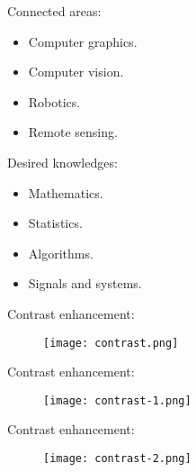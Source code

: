 
\begin{frame}
Connected areas:
\begin{itemize}
\item Computer graphics.
\item Computer vision.
\item Robotics.
\item Remote sensing.
\end{itemize}
\end{frame}


\begin{frame}
Desired knowledges:
\begin{itemize}
\item Mathematics.
\item Statistics.
\item Algorithms.
\item Signals and systems.
\end{itemize}
\end{frame}


\begin{frame}
Contrast enhancement:
\begin{figure}
\centering
\texttt{[image: contrast.png]}
\end{figure}
\end{frame}


\begin{frame}
Contrast enhancement:
\begin{figure}
\centering
\texttt{[image: contrast-1.png]}
\end{figure}
\end{frame}


\begin{frame}
Contrast enhancement:
\begin{figure}
\centering
\texttt{[image: contrast-2.png]}
\end{figure}
\end{frame}

